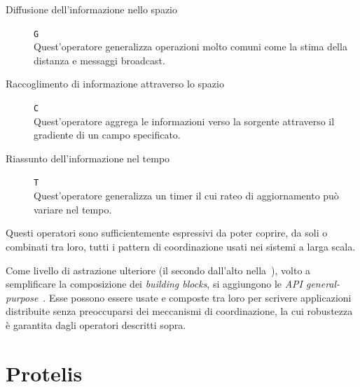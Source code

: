 

\begin{description}
  \item[Diffusione dell'informazione nello spazio] \texttt{G} \\ %
    Quest'operatore generalizza operazioni molto comuni come la stima della distanza e messaggi broadcast.
  \item[Raccoglimento di informazione attraverso lo spazio] \texttt{C} \\ %
    Quest'operatore aggrega le informazioni verso la sorgente attraverso il gradiente di un campo specificato.
  \item[Riassunto dell'informazione nel tempo] \texttt{T} \\ %
    Quest'operatore generalizza un timer il cui rateo di aggiornamento può variare nel tempo.
\end{description}

Questi operatori sono sufficientemente espressivi da poter coprire, da soli o combinati tra loro, tutti i pattern di coordinazione usati nei sistemi a larga scala.

Come livello di astrazione ulteriore (il secondo dall'alto nella~), volto a semplificare la composizione dei \emph{building blocks}, si aggiungono le \emph{API general-purpose}~\cite{amslaurea13090}.
Esse possono essere usate e composte tra loro per scrivere applicazioni distribuite senza preoccuparsi dei meccanismi di coordinazione, la cui robustezza è garantita dagli operatori descritti sopra.

\section{Protelis}\label{sec:protelis}

